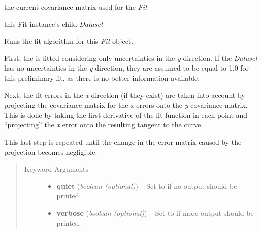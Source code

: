 \documentclass[a4paper,10pt,english]{sphinxmanual}
\begin{document}
\begin{fulllineitems}
\begin{fulllineitems}
\end{fulllineitems}


\begin{fulllineitems}
\label{index:kafe.fit.Fit.current_cov_mat}
the current covariance matrix used for the \emph{Fit}

\end{fulllineitems}


\begin{fulllineitems}
\label{index:kafe.fit.Fit.dataset}
this Fit instance's child \emph{Dataset}

\end{fulllineitems}


\begin{fulllineitems}
\label{index:kafe.fit.Fit.do_fit}
Runs the fit algorithm for this \emph{Fit} object.

First, the  is fitted considering only uncertainties
in the
\emph{y} direction. If the \emph{Dataset} has no uncertainties in the \emph{y}
direction, they are assumed to be equal to 1.0 for this preliminary
fit, as there is no better information available.

Next, the fit errors in the \emph{x} direction (if they exist) are taken
into account by projecting the covariance matrix for the \emph{x} errors
onto the \emph{y} covariance matrix. This is done by taking the first
derivative of the fit function in each point and ``projecting'' the \emph{x}
error onto the resulting tangent to the curve.

This last step is repeated until the change in the error matrix caused
by the projection becomes negligible.
\begin{quote}\begin{description}
\item[{Keyword Arguments}] \leavevmode\begin{itemize}
\item {} 
\textbf{quiet} (\emph{boolean (optional)}) --
Set to  if no output should be printed.

\item {} 
\textbf{verbose} (\emph{boolean (optional)}) --
Set to  if more output should be printed.


\end{itemize}
\end{description}
\end{quote}
\end{fulllineitems}
\end{fulllineitems}
\end{document}
